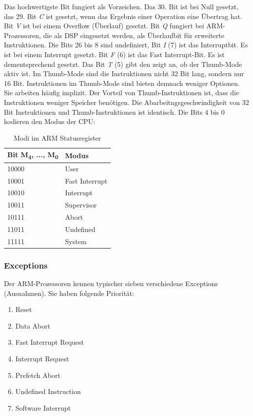 Das hochwertigste Bit fungiert als Vorzeichen. Das 30. Bit ist bei Null gesetzt, das 29. Bit \textit{C} ist gesetzt, wenn das Ergebnis einer Operation eine Übertrag hat. Bit \textit{V} ist bei einem Overflow (Überlauf) gesetzt. Bit \textit{Q} fungiert bei ARM-Prozessoren, die als \ac{DSP} eingesetzt werden, als Überlaufbit für erweiterte Instruktionen. Die Bits 26 bis 8 sind undefiniert, Bit \textit{I} (7) ist das Interruptbit. Es ist bei einem Interrupt gesetzt. Bit \textit{F} (6) ist das Fast Interrupt-Bit. Es ist dementsprechend gesetzt. Das Bit \textit{T} (5) gibt den zeigt an, ob der Thumb-Mode aktiv ist. Im Thumb-Mode sind die Instruktionen nicht 32 Bit lang, sondern nur 16 Bit. Instruktionen im Thumb-Mode sind bieten demnach weniger Optionen. Sie arbeiten häufig implizit. Der Vorteil von Thumb-Instruktionen ist, dass die Instruktionen weniger Speicher benötigen. Die Abarbeitngsgeschwindigkeit von 32 Bit Instruktionen und Thumb-Instruktionen ist identisch. Die Bits 4 bis 0 kodieren den Modus der CPU:
\begin{table}
    \begin{tabular}{l|l}
    Bit M\textsubscript{4}, ..., M\textsubscript{0}  & Modus          \\ \hline
    10000 & User           \\
    10001 & Fast Interrupt \\
    10010 & Interrupt      \\
    10011 & Supervisor     \\
    10111 & Abort          \\
    11011 & Undefined      \\
    11111 & System         \\
    \end{tabular}
    \caption {Modi im ARM Statusregister}
\end{table}

\subsubsection{Exceptions}
Der ARM-Prozessoren kennen typischer sieben verschiedene Exceptions (Ausnahmen). Sie haben folgende Priorität:
\begin{enumerate}
\item Reset
\item Data Abort
\item Fast Interrupt Request
\item Interrupt Request
\item Prefetch Abort
\item Undefined Instruction
\setcounter{enumi}{5} %
\item Software Interrupt
\end{enumerate}

